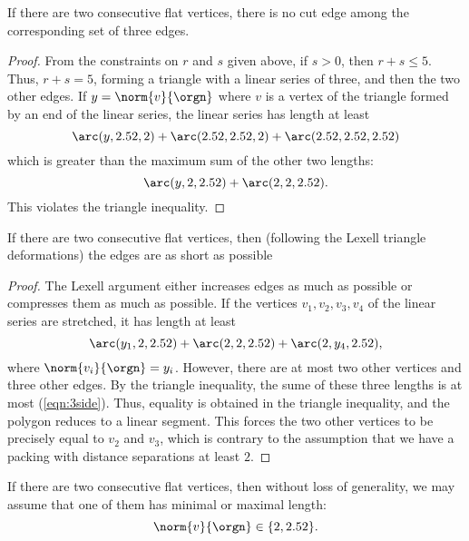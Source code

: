 \begin{lemma}
If there are two consecutive flat vertices, there is no cut edge among the corresponding set of three edges.
\end{lemma}

\begin{proof}  From the constraints on $r$ and $s$ given above, if $s>0$, then $r+s\le 5$.  Thus, $r+s=5$, forming a triangle with a linear series of three, and then the two other edges.  If $y=\norm{v}{\orgn}$ where $v$ is a vertex of the triangle formed by an end of the linear series, the linear series has length at least
$$
\arc(y,2.52,2)+\arc(2.52,2.52,2) +\arc(2.52,2.52,2.52)
$$
which is greater than the maximum sum of the other two lengths:
$$
\arc(y,2,2.52)+\arc(2,2,2.52).
$$
This violates the triangle inequality.
\end{proof}

\begin{lemma}  If there are two consecutive flat vertices, then (following the Lexell triangle deformations) the edges are as short as possible
\end{lemma}

\begin{proof} The Lexell argument either increases edges as much as possible or compresses them as much as possible.  If the vertices $v_1,v_2,v_3,v_4$ of the linear series are stretched, it has length at least
\begin{equation}\label{eqn:3side}
\arc(y_1,2,2.52)+\arc(2,2,2.52)+\arc(2,y_4,2.52),
\end{equation}
where $\norm{v_i}{\orgn}=y_i$.
However, there are at most two other vertices and three other edges.  By the triangle inequality, the sume of these three lengths is at most (\ref{eqn:3side}).
Thus, equality is obtained in the triangle inequality, and the polygon reduces to a linear segment.  This forces the two other vertices to be precisely equal to $v_2$ and $v_3$, which is contrary to the assumption that we have a packing with distance separations at least $2$.
\end{proof}

\begin{lemma} If there are two consecutive flat vertices, then without loss of generality, we may assume that one of them has minimal or maximal length:
$$\norm{v}{\orgn}\in \{2,2.52\}.$$
\end{lemma}

